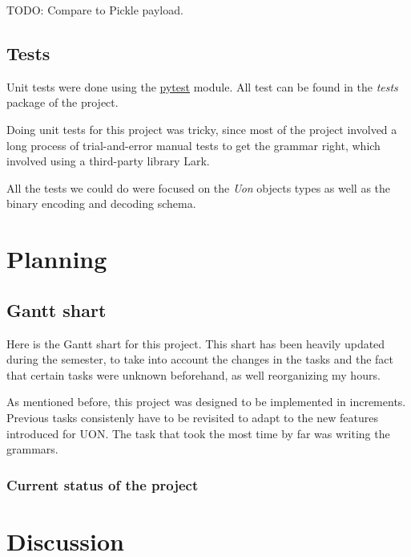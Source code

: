 \documentclass[12pt]{article}
\begin{document}
TODO: Compare to Pickle payload.
\pagebreak

\subsection{Tests}
Unit tests were done using the \href{https://docs.pytest.org/en/stable/}{pytest} module. All test can be found in the \emph{tests} package of the project.  

Doing unit tests for this project was tricky, since most of the project involved a long process of trial-and-error manual tests to get the grammar right, which involved using a third-party library Lark.

All the tests we could do were focused on the \emph{Uon} objects types as well as the binary encoding and decoding schema. 
\pagebreak

\section{Planning}

\subsection{Gantt shart}
Here is the Gantt shart for this project. This shart has been heavily updated during the semester, to take into account the changes in the tasks and the fact that certain tasks were unknown beforehand, as well reorganizing my hours. 

As mentioned before, this project was designed to be implemented in increments. Previous tasks consistenly have to be revisited to adapt to the new features introduced for UON. The task that took the most time by far was writing the grammars. 



\subsubsection{Current status of the project}


\pagebreak

\section{Discussion}
\end{document}
